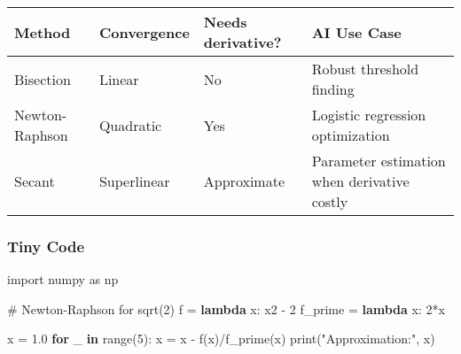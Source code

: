 \documentclass[
  letterpaper,
  DIV=11,
  numbers=noendperiod]{scrreprt}
\newenvironment{Shaded}{\begin{snugshade}}{\end{snugshade}}
\newcommand{\BuiltInTok}[1]{\textcolor[rgb]{0.00,0.23,0.31}{#1}}
\newcommand{\CommentTok}[1]{\textcolor[rgb]{0.37,0.37,0.37}{#1}}
\newcommand{\ControlFlowTok}[1]{\textcolor[rgb]{0.00,0.23,0.31}{\textbf{#1}}}
\newcommand{\DecValTok}[1]{\textcolor[rgb]{0.68,0.00,0.00}{#1}}
\newcommand{\FloatTok}[1]{\textcolor[rgb]{0.68,0.00,0.00}{#1}}
\newcommand{\ImportTok}[1]{\textcolor[rgb]{0.00,0.46,0.62}{#1}}
\newcommand{\KeywordTok}[1]{\textcolor[rgb]{0.00,0.23,0.31}{\textbf{#1}}}
\newcommand{\NormalTok}[1]{\textcolor[rgb]{0.00,0.23,0.31}{#1}}
\newcommand{\OperatorTok}[1]{\textcolor[rgb]{0.37,0.37,0.37}{#1}}
\newcommand{\StringTok}[1]{\textcolor[rgb]{0.13,0.47,0.30}{#1}}
\begin{document}
\begin{longtable}[]{@{}
  >{\raggedright\arraybackslash}p{}
  >{\raggedright\arraybackslash}p{}
  >{\raggedright\arraybackslash}p{}
  >{\raggedright\arraybackslash}p{}@{}}
\toprule\noalign{}
\begin{minipage}[b]{\linewidth}\raggedright
Method
\end{minipage} & \begin{minipage}[b]{\linewidth}\raggedright
Convergence
\end{minipage} & \begin{minipage}[b]{\linewidth}\raggedright
Needs derivative?
\end{minipage} & \begin{minipage}[b]{\linewidth}\raggedright
AI Use Case
\end{minipage} \\
\midrule\noalign{}
\endhead
\bottomrule\noalign{}
\endlastfoot
Bisection & Linear & No & Robust threshold finding \\
Newton-Raphson & Quadratic & Yes & Logistic regression optimization \\
Secant & Superlinear & Approximate & Parameter estimation when
derivative costly \\
\end{longtable}

\subsubsection{Tiny Code}\label{tiny-code-151}

\begin{Shaded}
\begin{Highlighting}[]
\ImportTok{import}\NormalTok{ numpy }\ImportTok{as}\NormalTok{ np}

\CommentTok{\# Newton{-}Raphson for sqrt(2)}
\NormalTok{f }\OperatorTok{=} \KeywordTok{lambda}\NormalTok{ x: x2 }\OperatorTok{{-}} \DecValTok{2}
\NormalTok{f\_prime }\OperatorTok{=} \KeywordTok{lambda}\NormalTok{ x: }\DecValTok{2}\OperatorTok{*}\NormalTok{x}

\NormalTok{x }\OperatorTok{=} \FloatTok{1.0}
\ControlFlowTok{for}\NormalTok{ \_ }\KeywordTok{in} \BuiltInTok{range}\NormalTok{(}\DecValTok{5}\NormalTok{):}
\NormalTok{    x }\OperatorTok{=}\NormalTok{ x }\OperatorTok{{-}}\NormalTok{ f(x)}\OperatorTok{/}\NormalTok{f\_prime(x)}
    \BuiltInTok{print}\NormalTok{(}\StringTok{"Approximation:"}\NormalTok{, x)}
\end{Highlighting}
\end{Shaded}
\end{document}
